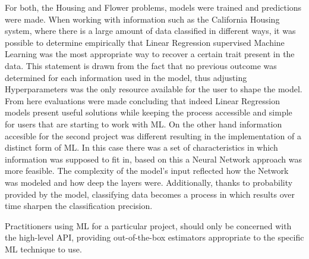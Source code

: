 For both, the Housing and Flower problems, models were trained and predictions were made. When working with information such as the California Housing system, where there is a large amount of data classified in different ways, it was possible to determine empirically that Linear Regression supervised Machine Learning was the most appropriate way to recover a certain trait present in the data. This statement is drawn from the fact that no previous outcome was determined for each information used in the model, thus adjusting Hyperparameters was the only resource available for the user to shape the model.  From here evaluations were made concluding that indeed Linear Regression models present useful solutions while keeping the process accessible and simple for users that are starting to work with \ac{ML}.  On the other hand information accesible for the second project was different resulting in the implementation of a distinct form of \ac{ML}. In this case there was a set of characteristics in which information was supposed to fit in, based on this a Neural Network approach was more feasible. The complexity of the model's input reflected how the Network was modeled and how deep the layers were. Additionally, thanks to probability provided by the model, classifying data becomes a process in which results over time sharpen the classification precision. 


Practitioners using \ac{ML} for a particular project, should only be concerned with the high-level API, providing out-of-the-box estimators appropriate to the specific \ac{ML} technique to use.




\endinput



